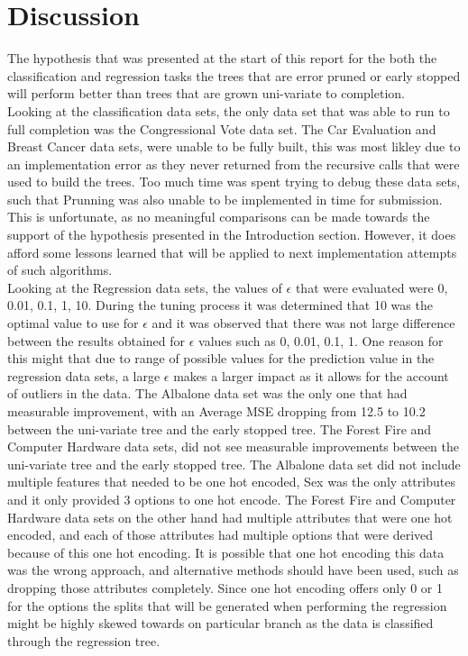\documentclass[twoside,11pt]{article}
\begin{document}
\section{Discussion}
\hspace*{10mm} The hypothesis that was presented at the start of this report for the both the classification and regression tasks the trees that are error pruned or early stopped will perform better than trees that are grown uni-variate to completion.\\
\hspace*{10mm} Looking at the classification data sets, the only data set that was able to run to full completion was the Congressional Vote data set. The Car Evaluation and Breast Cancer data sets, were unable to be fully built, this was most likley due to an implementation error as they never returned from the recursive calls that were used to build the trees. Too much time was spent trying to debug these data sets, such that Prunning was also unable to be implemented in time for submission. This is unfortunate, as no meaningful comparisons can be made towards the support of the hypothesis presented in the Introduction section. However, it does afford some lessons learned that will be applied to next implementation attempts of such algorithms.  \\
\hspace*{10mm} Looking at the Regression data sets, the values of $\epsilon$ that were evaluated were 0, 0.01, 0.1, 1, 10. During the tuning process it was determined that 10 was the optimal value to use for $\epsilon$ and it was observed that there was not large difference between the results obtained for $\epsilon$ values such as 0, 0.01, 0.1, 1. One reason for this might that due to range of possible values for the prediction value in the regression data sets, a large $\epsilon$ makes a larger impact as it allows for the account of outliers in the data. The Albalone data set was the only one that had measurable improvement, with an Average MSE dropping from 12.5 to 10.2 between the uni-variate tree and the early stopped tree. The Forest Fire and Computer Hardware data sets, did not see measurable improvements between the uni-variate tree and the early stopped tree. The Albalone data set did not include multiple features that needed to be one hot encoded, Sex was the only attributes and it only provided 3 options to one hot encode. The Forest Fire and Computer Hardware data sets on the other hand had multiple attributes that were one hot encoded, and each of those attributes had multiple options that were derived because of this one hot encoding. It is possible that one hot encoding this data was the wrong approach, and alternative methods should have been used, such as dropping those attributes completely. Since one hot encoding offers only 0 or 1 for the options the splits that will be generated when performing the regression might be highly skewed towards on particular branch as the data is classified through the regression tree.\\
\end{document}
